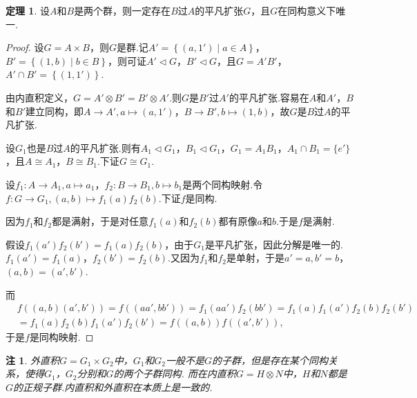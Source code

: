 \documentclass[12pt]{ctexart}
\theoremstyle{definition}
\newtheorem{theorem}{定理}
\theoremstyle{plain}
\newtheorem*{remark}{注}
\begin{document}
	\begin{theorem}
		设$A$和$B$是两个群，则一定存在$B$过$A$的平凡扩张$G$，且$G$在同构意义下唯一.
	\end{theorem}
	\begin{proof}
		设$G=A\times B$，则$G$是群.记$A'=\left\{(a,1')\mid a\in A\right\}$，$B'=\left\{(1,b)\mid b\in B\right\}$，则可证$A'\lhd G$，$B'\lhd G$，且$G=A'B'$，$A'\cap B'=\left\{(1,1')\right\}$.
		
		由内直积定义，$G=A'\otimes B'=B'\otimes A'$.则$G$是$B'$过$A'$的平凡扩张.容易在$A$和$A'$，$B$和$B'$建立同构，即$A\to A',a\mapsto(a,1')$，$B\to B',b\mapsto(1,b)$，故$G$是$B$过$A$的平凡扩张.
		
		设$G_1$也是$B$过$A$的平凡扩张.则有$A_1\lhd G_1$，$B_1\lhd G_1$，$G_1=A_1B_1$，$A_1\cap B_1=\{e'\}$，且$A\cong A_1$，$B\cong B_1$.下证$G\cong G_1$.
		
		设$f_1:A\to A_1,a\mapsto a_1$，$f_2:B\to B_1,b\mapsto b_1$是两个同构映射.令$f:G\to G_1,(a,b)\mapsto f_1(a)f_2(b)$.下证$f$是同构.
		
		因为$f_1$和$f_2$都是满射，于是对任意$f_1(a)$和$f_2(b)$都有原像$a$和$b$.于是$f$是满射.
		
		假设$f_1(a')f_2(b')=f_1(a)f_2(b)$，由于$G_1$是平凡扩张，因此分解是唯一的. $f_1(a')=f_1(a)$，$f_2(b')=f_2(b)$.又因为$f_1$和$f_2$是单射，于是$a'=a,b'=b$，$(a,b)=(a',b')$.
		
		而
		\begin{equation*}
			\begin{aligned}
				&f\left((a,b)(a',b')\right)=f\left((aa',bb')\right)=f_1(aa')f_2(bb')=f_1(a)f_1(a')f_2(b)f_2(b')\\
				&=f_1(a)f_2(b)f_1(a')f_2(b')=f\left((a,b)\right)f\left((a',b')\right),
			\end{aligned}
		\end{equation*}
		于是$f$是同构映射.
	\end{proof}
	\begin{remark}
		外直积$G=G_1\times G_2$中，$G_1$和$G_2$一般不是$G$的子群，但是存在某个同构关系，使得$G_1$，$G_2$分别和$G$的两个子群同构. 而在内直积$G=H\otimes N$中，$H$和$N$都是$G$的正规子群.内直积和外直积在本质上是一致的.
	\end{remark}
\end{document}
